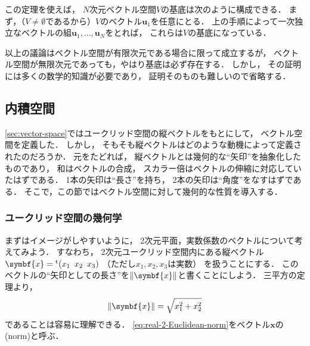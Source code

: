 \documentclass[
]{sotsu}
\begin{document}
この定理を使えば，
$N$次元ベクトル空間$V$の基底は次のように構成できる．
まず，（$V \neq \emptyset$であるから）$V$のベクトル$\symbf{u}_1$を任意にとる．
上の手順によって一次独立なベクトルの組$\symbf{u}_1, \dots, \symbf{u}_N$をとれば，
これらは$V$の基底になっている．

以上の議論はベクトル空間が有限次元である場合に限って成立するが，
ベクトル空間が無限次元であっても，やはり基底は必ず存在する．
しかし，
その証明には多くの数学的知識が必要であり，
証明そのものも難しいので省略する．



\subsection{内積空間}
\label{sec:topological-vector-space}

\cref{sec:vector-space}ではユークリッド空間の縦ベクトルをもとにして，
ベクトル空間を定義した．
しかし，
そもそも縦ベクトルはどのような動機によって定義されたのだろうか．
元をたどれば，
縦ベクトルとは幾何的な``矢印''を抽象化したものであり，
和はベクトルの合成，
スカラー倍はベクトルの伸縮に対応していたはずである．
1本の矢印は``長さ''を持ち，
2本の矢印は``角度''をなすはずである．
そこで，この節ではベクトル空間に対して幾何的な性質を導入する．


\subsubsection{ユークリッド空間の幾何学}
\label{sec:Euclidean-inner-product-space}

\quad 
まずはイメージがしやすいように，
2次元平面，実数係数のベクトルについて考えてみよう．
すなわち，
2次元ユークリッド空間内にある縦ベクトル$\symbf{x} = \cvector{x_1 ; x_2 ; x_3}$
（ただし$x_1, x_2, x_3$は実数）
を扱うことにする．
このベクトルの``矢印としての長さ''を$\norm{\symbf{x}}$と書くことにしよう．
三平方の定理より，
\begin{equation}
    \label{eq:real-2-Euclidean-norm}
    \norm{\symbf{x}} = \sqrt{ x_1^2 + x_2^2 }
\end{equation}
であることは容易に理解できる．
\cref{eq:real-2-Euclidean-norm}をベクトル$\symbf{x}$の(norm)と呼ぶ．
\end{document}

